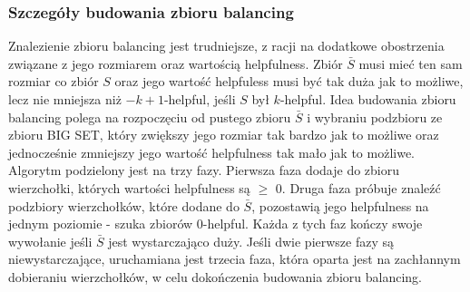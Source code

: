 \subsubsection{Szczegóły budowania zbioru balancing}

Znalezienie zbioru balancing jest trudniejsze, z racji na dodatkowe obostrzenia związane z jego rozmiarem oraz wartością
helpfulness.
Zbiór $\bar{S}$ musi mieć ten sam rozmiar co zbiór $S$ oraz jego wartość helpfuless musi być tak duża jak to możliwe,
lecz nie mniejsza niż $-k+1$-helpful, jeśli $S$ był $k$-helpful.
Idea budowania zbioru balancing polega na rozpoczęciu od pustego zbioru $\bar{S}$ i wybraniu podzbioru
ze zbioru BIG SET, który zwiększy jego rozmiar tak bardzo jak to możliwe oraz jednocześnie zmniejszy jego wartość
helpfulness tak mało jak to możliwe.
Algorytm podzielony jest na trzy fazy.
Pierwsza faza dodaje do zbioru wierzchołki, których wartości helpfulness są $\geq$ $0$.
Druga faza próbuje znaleźć podzbiory wierzchołków, które dodane do $\bar{S}$, pozostawią jego helpfulness na jednym
poziomie - szuka zbiorów $0$-helpful.
Każda z tych faz kończy swoje wywołanie jeśli $\bar{S}$ jest wystarczająco duży.
Jeśli dwie pierwsze fazy są niewystarczające, uruchamiana jest trzecia faza, która oparta jest na zachłannym dobieraniu
wierzchołków, w celu dokończenia budowania zbioru balancing.

